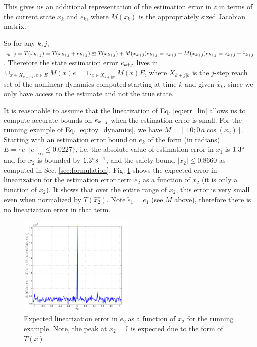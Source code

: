 This gives us an additional representation of the estimation error in $z$ in terms of the current state $x_k$ and $e_k$, where $M(x_k)$ is the appropriately sized Jacobian matrix. 

So for any $k,j$, $\hat{z}_{k+j} = T(\hat{x}_{k+j}) = T(x_{k+j} + e_{k+j}) \approxeq T(x_{k+j}) + M(x_{k+j})e_{k+j} = z_{k+j} + M(x_{k+j})e_{k+j} = z_{k+j} + \tilde{e}_{{k+j}}$.
Therefore the state estimation error $\tilde{e}_{k+j}$ lives in 
$\cup_{x\in X_{k+j|k}, e \in E}M(x)e = \cup_{x \in X_{k+j|k}}M(x)E$, 
where $X_{k+j|k}$ is the $j$-step reach set of the nonlinear dynamics computed starting at time $k$ and given $\hat{x}_k$, since we only have access to the estimate and not the true state.

It is reasonable to assume that the linearization of Eq. \ref{eq:err_lin} allows us to compute accurate bounds on $\tilde{e}_{k+j}$ when the estimation error is small. For the running example of Eq. \ref{eq:toy_dynamics}, we have $M = [1 \, 0;0 \,a\cos(x_2)]$. Starting with an estimation error bound on $e_k$ of the form (in radians) $E = \lbrace e| ||e||_{\infty} \leq 0.0227\rbrace$, i.e. the absolute value of estimation error in $x_1$ is $1.3\degree$ and for $x_2$ is bounded by $1.3\degree s^{-1}$, and the safety bound $|x_2|\leq 0.8660$ as computed in Sec. \ref{sec:formulation}, Fig. \ref{fig:fb_err} shows the expected error in linearization for the estimation error term $\tilde{e}_2$ as a function of $x_2$ (it is only a function of $x_2$). It shows that over the entire range of $x_2$, this error is very small even when normalized by $T(\hat{x_2})$. Note $\tilde{e}_1 = e_1$ (see $M$ above), therefore there is no linearization error in that term.


\begin{figure}
\includegraphics[width=0.49\textwidth]{figs/Toy_LinErrEst_scissored.pdf}
\caption{Expected linearization error in $\tilde{e}_2$ as a function of $x_2$ for the running example. Note, the peak at $x_2=0$ is expected due to the form of $T(x)$. }
\label{fig:fb_err}
\end{figure}
